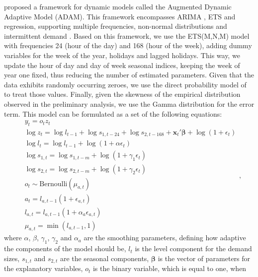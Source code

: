 \documentclass[]{elsarticle} %
\begin{document}
\citet{SvetunkovAdam2021} proposed a framework for dynamic models called the
Augmented Dynamic Adaptive Model (ADAM). This framework encompasses
ARIMA \citep{Box1976}, ETS \citep{Hyndman2008b} and regression, supporting
multiple frequencies, non-normal distributions and intermittent demand
\citep{Svetunkov2019a}. Based on this framework, we use the ETS(M,N,M) model
with frequencies 24 (hour of the day) and 168 (hour of the week), adding
dummy variables for the week of the year, holidays and lagged holidays.
This way, we update the hour of day and day of week seasonal indices,
keeping the week of year one fixed, thus reducing the number of
estimated parameters. Given that the data exhibits randomly occurring
zeroes, we use the direct probability model of \citet{Svetunkov2019a} to treat
those values. Finally, given the skewness of the empirical distribution
observed in the preliminary analysis, we use the Gamma distribution for
the error term. This model can be formulated as a set of the following
equations: \begin{equation}
    \begin{aligned}
      & y_t = o_t z_t \\
        & \log z_t = \log l_{t-1} + \log s_{1,t-24} + \log s_{2,t-168} + \mathbf{x}_t' \boldsymbol{\beta} + \log \left(1 + \epsilon_{t} \right) \\
        & \log l_{t} = \log l_{t-1} + \log( 1  + \alpha \epsilon_{t}) \\ 
        & \log s_{1,t} = \log s_{1,t-m} + \log( 1  + \gamma_1 \epsilon_{t}) \\
        & \log s_{2,t} = \log s_{2,t-m} + \log( 1  + \gamma_2 \epsilon_{t}) \\
        & o_t \sim \text{Bernoulli} \left(\mu_{a,t} \right) \\
        & a_t = l_{a,t-1} \left(1 + \epsilon_{a,t} \right) \\
        & l_{a,t} = l_{a,t-1}( 1  + \alpha_{a} \epsilon_{a,t}) \\
        & \mu_{a,t} = \min(l_{a,t-1}, 1)
    \end{aligned} ,
    \label{eq:ADAMModel}
\end{equation} where \(\alpha\), \(\beta\), \(\gamma_1\), \(\gamma_2\) and
\(\alpha_a\) are the smoothing parameters, defining how adaptive the
components of the model should be, \(l_t\) is the level component for the
demand sizes, \(s_{1,t}\) and \(s_{2,t}\) are the seasonal components,
\(\boldsymbol{\beta}\) is the vector of parameters for the explanatory
variables, \(o_t\) is the binary variable, which is equal to one, when
\end{document}
